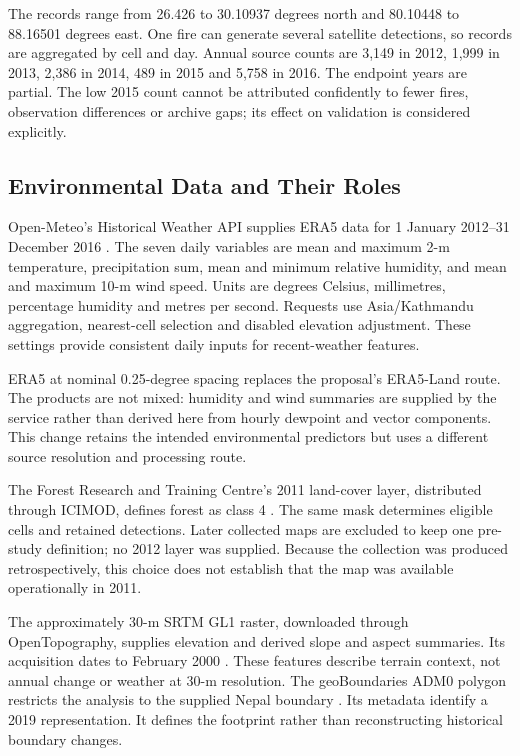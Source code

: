 \documentclass[conference,a4paper]{IEEEtran}
\begin{document}
The records range from 26.426 to 30.10937 degrees north and 80.10448 to 88.16501 degrees east. One fire can generate several satellite detections, so records are aggregated by cell and day. Annual source counts are 3,149 in 2012, 1,999 in 2013, 2,386 in 2014, 489 in 2015 and 5,758 in 2016. The endpoint years are partial. The low 2015 count cannot be attributed confidently to fewer fires, observation differences or archive gaps; its effect on validation is considered explicitly.

\subsection{Environmental Data and Their Roles}
Open-Meteo's Historical Weather API supplies ERA5 data for 1 January 2012--31 December 2016 \citep{openmeteo,hersbach}. The seven daily variables are mean and maximum 2-m temperature, precipitation sum, mean and minimum relative humidity, and mean and maximum 10-m wind speed. Units are degrees Celsius, millimetres, percentage humidity and metres per second. Requests use Asia/Kathmandu aggregation, nearest-cell selection and disabled elevation adjustment. These settings provide consistent daily inputs for recent-weather features.

ERA5 at nominal 0.25-degree spacing replaces the proposal's ERA5-Land route. The products are not mixed: humidity and wind summaries are supplied by the service rather than derived here from hourly dewpoint and vector components. This change retains the intended environmental predictors but uses a different source resolution and processing route.

The Forest Research and Training Centre's 2011 land-cover layer, distributed through ICIMOD, defines forest as class 4 \citep{frtc}. The same mask determines eligible cells and retained detections. Later collected maps are excluded to keep one pre-study definition; no 2012 layer was supplied. Because the collection was produced retrospectively, this choice does not establish that the map was available operationally in 2011.

The approximately 30-m SRTM GL1 raster, downloaded through OpenTopography, supplies elevation and derived slope and aspect summaries. Its acquisition dates to February 2000 \citep{srtm}. These features describe terrain context, not annual change or weather at 30-m resolution. The geoBoundaries ADM0 polygon restricts the analysis to the supplied Nepal boundary \citep{runfola}. Its metadata identify a 2019 representation. It defines the footprint rather than reconstructing historical boundary changes.
\end{document}
